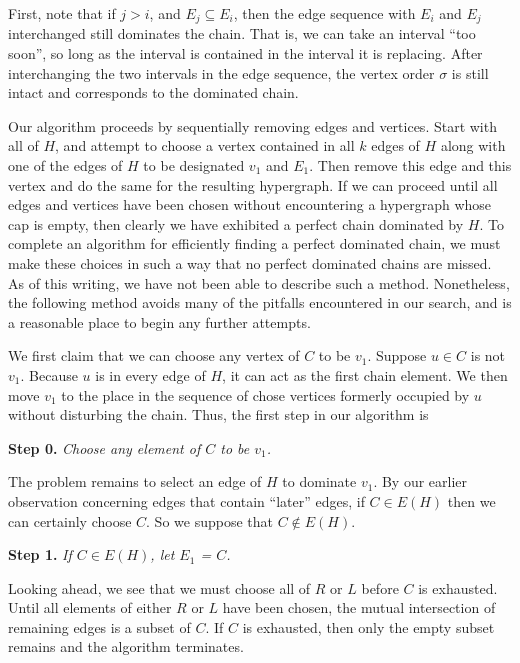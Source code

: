 First, note that if $j > i$, and $E_j \subseteq E_i$, then the edge sequence with $E_i$ and $E_j$ interchanged still dominates the chain. 
%
That is, we can take an interval ``too soon'', so long as the interval is contained in the interval it is replacing. 
%
After interchanging the two intervals in the edge sequence, the vertex order $\sigma$ is still intact and corresponds to the dominated chain. 

Our algorithm proceeds by sequentially removing edges and vertices.  Start with all of $H$, and attempt to choose a vertex contained in all $k$  edges of $H$ along with one of the edges of $H$ to be designated $v_1$ and $E_1$.  
%
Then remove this edge and this vertex and do the same for the resulting hypergraph.    
%
If we can proceed until all edges and vertices have been chosen without encountering a hypergraph whose cap is empty, then clearly we have exhibited a perfect chain dominated by $H$.
%
To complete an algorithm for efficiently finding a perfect dominated chain, we must make these choices in such a way that no perfect dominated chains are missed.  As of this writing, we have not been able to describe such a method.  Nonetheless, the following method avoids many of the pitfalls encountered in our search, and is a reasonable place to begin any further attempts.


We first claim that we can choose any vertex of $C$ to be $v_1$.  
%
Suppose $u \in C$ is not $v_1$.  
%
Because $u$ is in every edge of $H$, it can act as the first chain element.  
%
We then move $v_1$ to the place in the sequence of chose vertices formerly occupied by $u$ without disturbing the chain.  
%
Thus, the first step in our algorithm is

\begin{framed}{\bf Step 0.} {\it Choose any element of $C$ to be $v_1$.}
\end{framed}

The problem remains to select an edge of $H$ to dominate $v_1$.  
%
By our earlier observation concerning edges that contain ``later'' edges, if $C \in E(H)$ then we can certainly choose $C$.  So we suppose that $C \notin E(H)$.
%

\begin{framed}{\bf Step 1.}  {\it If $C \in E(H)$, let $E_1$ = $C$.}
\end{framed}

Looking ahead,  we see that we must choose all of $R$ or $L$ before $C$ is exhausted.  
%
Until all elements of either $R$ or $L$ have been chosen, the mutual intersection of remaining edges is a subset of $C$.  
%
If $C$ is exhausted, then only the empty subset remains and the algorithm terminates.
%

